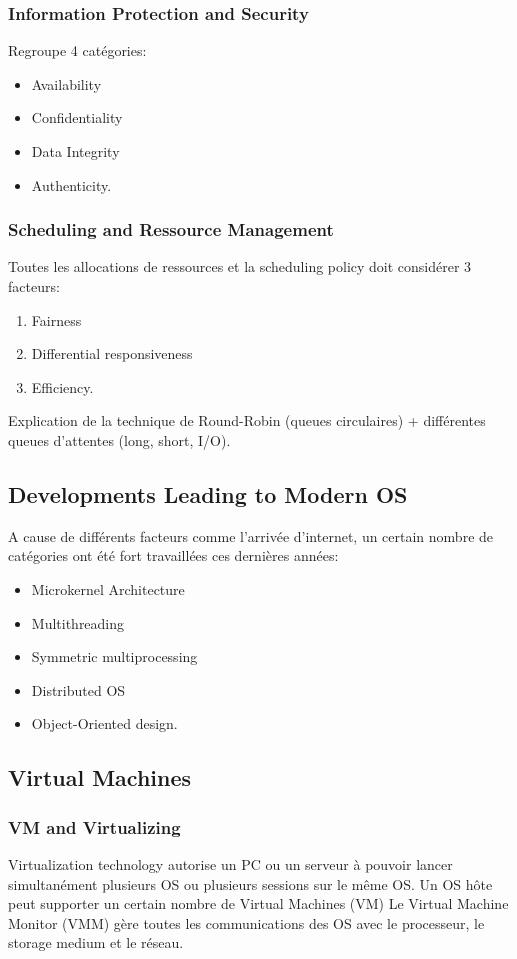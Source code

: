 \subsubsection{Information Protection and Security}
Regroupe 4 catégories:
\begin{itemize}
  \item Availability
  \item Confidentiality
  \item Data Integrity
  \item Authenticity.
\end{itemize}

\subsubsection{Scheduling and Ressource Management}
Toutes les allocations de ressources et la scheduling policy doit considérer 3 facteurs:
\begin{enumerate}
  \item Fairness
  \item Differential responsiveness
  \item Efficiency.
\end{enumerate}
Explication de la technique de Round-Robin (queues circulaires) + différentes queues d'attentes (long, short, I/O).

\subsection{Developments Leading to Modern OS}
A cause de différents facteurs comme l'arrivée d'internet, un certain nombre de catégories ont été fort travaillées ces dernières années: \\
\begin{itemize}
  \item Microkernel Architecture
  \item Multithreading
  \item Symmetric multiprocessing
  \item Distributed OS
  \item Object-Oriented design.
\end{itemize}

\subsection{Virtual Machines}

\subsubsection{VM and Virtualizing}
Virtualization technology autorise un PC ou un serveur à pouvoir lancer simultanément plusieurs OS ou plusieurs sessions sur le même OS.
Un OS hôte peut supporter un certain nombre de Virtual Machines (VM)
Le Virtual Machine Monitor (VMM) gère toutes les communications des OS avec le processeur, le storage medium et le réseau.

